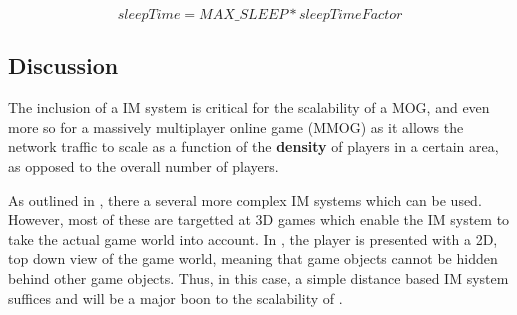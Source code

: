 \begin{equation}
    sleepTime = MAX\_SLEEP * sleepTimeFactor
\end{equation}

\subsection{Discussion}
The inclusion of a IM system is critical for the scalability of a MOG, and even more so for a massively multiplayer online game (MMOG) as it allows the network traffic to scale as a function of the \textbf{density} of players in a certain area, as opposed to the overall number of players.

As outlined in , there a several more complex IM systems which can be used. However, most of these are targetted at 3D games which enable the IM system to take the actual game world into account. In \game{}, the player is presented with a 2D, top down view of the game world, meaning that game objects cannot be hidden behind other game objects. Thus, in this case, a simple distance based IM system suffices and will be a major boon to the scalability of \game{}.
